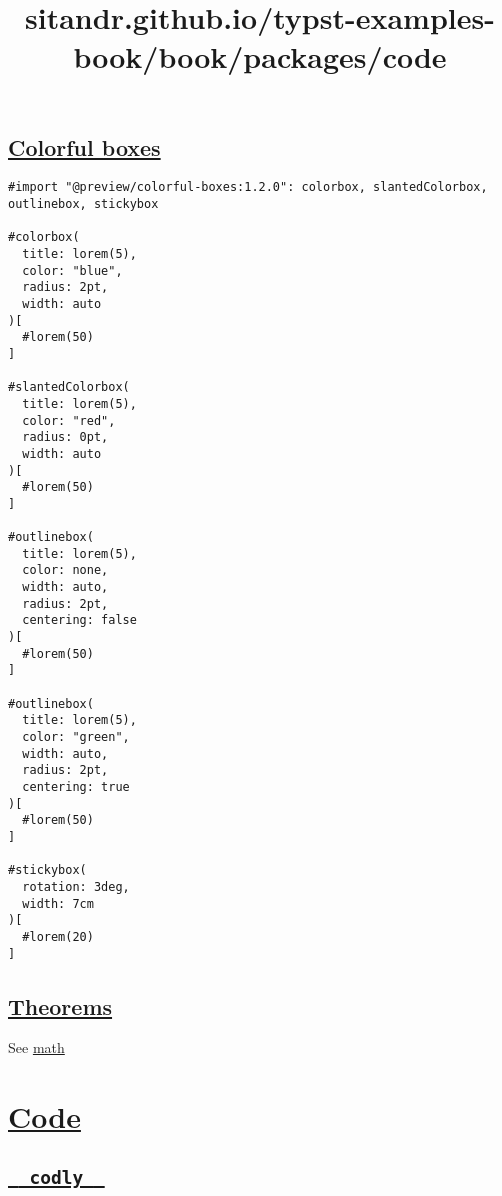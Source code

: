 \pandocbounded{}

\subsection{\texorpdfstring{\hyperref[colorful-boxes]{Colorful
boxes}}{Colorful boxes}}\label{colorful-boxes}

\begin{verbatim}
#import "@preview/colorful-boxes:1.2.0": colorbox, slantedColorbox, outlinebox, stickybox

#colorbox(
  title: lorem(5),
  color: "blue",
  radius: 2pt,
  width: auto
)[
  #lorem(50)
]

#slantedColorbox(
  title: lorem(5),
  color: "red",
  radius: 0pt,
  width: auto
)[
  #lorem(50)
]

#outlinebox(
  title: lorem(5),
  color: none,
  width: auto,
  radius: 2pt,
  centering: false
)[
  #lorem(50)
]

#outlinebox(
  title: lorem(5),
  color: "green",
  width: auto,
  radius: 2pt,
  centering: true
)[
  #lorem(50)
]

#stickybox(
  rotation: 3deg,
  width: 7cm
)[
  #lorem(20)
]
\end{verbatim}

\pandocbounded{}

\subsection{\texorpdfstring{\hyperref[theorems]{Theorems}}{Theorems}}\label{theorems}

See \href{./math.html}{math}


\title{sitandr.github.io/typst-examples-book/book/packages/code}

\section{\texorpdfstring{\hyperref[code]{Code}}{Code}}\label{code}

\subsection{\texorpdfstring{\hyperref[codly]{\texttt{\ }{\texttt{\ codly\ }}\texttt{\ }}}{  codly  }}\label{codly}

